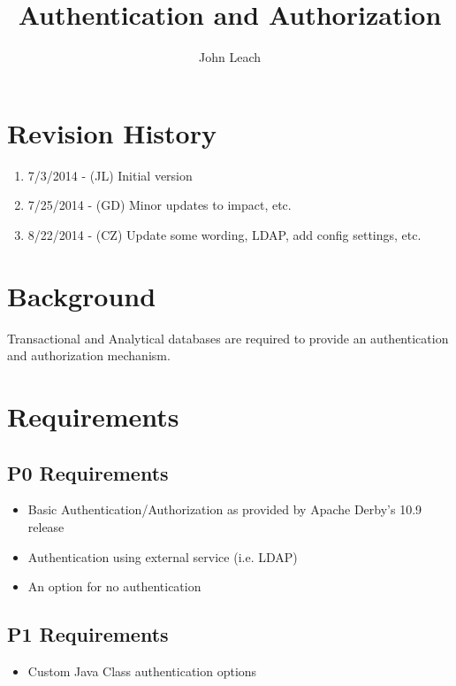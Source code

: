 
%

\title{Authentication and Authorization}
\author{John Leach}
\maketitle

\section{Revision History}
\begin{enumerate}
  \item 7/3/2014 - (JL) Initial version
  \item 7/25/2014 - (GD) Minor updates to impact, etc.
  \item 8/22/2014 - (CZ) Update some wording, LDAP, add config settings, etc.
\end{enumerate}

\section{Background}
Transactional and Analytical databases are required to provide an
authentication and authorization mechanism.

\section{Requirements}

\subsection{P0 Requirements}
\begin{itemize}
  \item Basic Authentication/Authorization as provided by Apache Derby's 10.9 release
  \item Authentication using external service (i.e. LDAP)
  \item An option for no authentication
\end{itemize}

\subsection{P1 Requirements}
\begin{itemize}
  \item Custom Java Class authentication options
\end{itemize}


